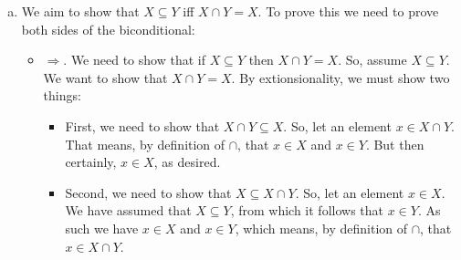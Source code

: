 \begin{itemize}
\begin{enumerate}[(a)]
                \begin{enumerate}[(i)]
                  \item $Y \subseteq X \cup Y$: from the definition of union follows that $X\cup Y$ consists of all elements in $X$ and all elements in $Y$, hence all elements in $Y$ are in $X\cup Y$, which is what we needed to show.
                  \item $X\cup Y \subseteq Y$ Let $x$ be an arbitrary element of $X \cup Y$.
                        By the definition of union, we know that $x \in Y$ or $X \in X$.
                        We now make a distinction by cases (see \S2.3.9).
                        When $x \in Y$, we are fine, as we want to show that $x \in Y$.
                        When $x \in X$, we know by our assumption that $X\subseteq Y$, that $x \in Y$.
                        Therefore all $x \in X\cup Y$ are in $Y$, therefore $X\cup Y \subseteq Y$.
                \end{enumerate}
            Using the axiom of Extensionality, we can now conclude that $X \cup Y = Y$. \\\\
            $\Leftarrow\\to\ prove:$\\If $X\cup Y=Y$, then $X\subseteq Y$. We'll prove the contrapositive. We assume that $X \not \subseteq Y$. Hence there must be some element $x\in X$ such that $x\not \in Y$. As $X \cup Y$ contains all elements of $X$, it must also contain $x$. As there's one element that is in $X\cup Y$ and not in $Y$, $X \cup Y \neq Y$, which is what we needed to prove.\\\\ As we've now proved both directions, we've proved $X\subseteq Y$ iff $X\cup Y = Y \square$

          \item  We aim to show that $X \subseteq Y$ iff $X \cap Y = X$. To prove this we need to prove both sides of the biconditional:
            \begin{itemize}
              \item $\Rightarrow$. We need to show that if $X \subseteq Y$ then  $X \cap Y = X$. So, assume $X \subseteq Y$.
                We want to show that $X \cap Y = X$.
                By extionsionality, we must show two things:
                \begin{itemize}
                  \item First, we need to show that $X \cap Y \subseteq X$.
                    So, let an element $x \in X \cap Y$.
                    That means, by definition of $\cap$, that $x \in X$ and $x \in Y$.
                    But then certainly, $x \in X$, as desired.
                  \item Second, we need to show that $X \subseteq X \cap Y$.
                    So, let an element $x \in X$.
                    We have assumed that $X \subseteq Y$,
                    from which it follows that $x \in Y$.
                    As such we have $x \in X$ and $x \in Y$, which means, by definition of $\cap$, that $x \in X \cap Y$.
                \end{itemize}


\end{itemize}
\end{enumerate}
\end{itemize}
